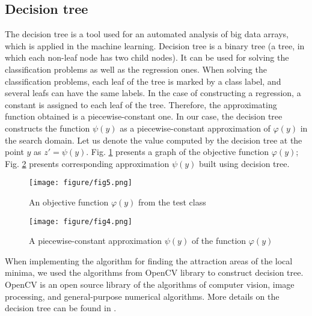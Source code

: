 \documentclass{cmi}
\begin{document}
\subsection{Decision tree}\label{SecDT}

The decision tree is a tool used for an automated analysis of big data arrays, which is applied in the  machine learning. Decision tree is a binary tree (a tree, in which each non-leaf node has two child nodes). It can be used for solving the classification problems as well as the regression ones. When solving  the classification problems, each leaf of the tree is marked by a class label, and several leafs can have  the same labels. In the case of constructing a regression, a constant is assigned to each leaf of the tree.   Therefore, the approximating function obtained is a piecewise-constant one. In our case, the decision tree constructs the function $\psi(y)$ as a piecewise-constant  approximation of $\varphi(y)$ in the search domain. Let us denote the value  computed by the  decision tree at the point $y$ as $z' = \psi(y)$.
Fig. \ref{fig:fig2} presents a graph of the objective function $\varphi(y)$; Fig. \ref{fig:fig2_2} presents corresponding approximation $\psi(y)$ built using decision tree. 


\begin{figure}
	\begin{center}
		\begin{minipage}[h]{0.7\linewidth}
			\texttt{[image: figure/fig5.png]}
			\caption{An objective function $\varphi(y)$ from the test class} %
			\label{fig:fig2}
		\end{minipage}
	\end{center}
\end{figure}	

\begin{figure}
	\begin{center}
		\begin{minipage}[h]{0.7\linewidth}
			\texttt{[image: figure/fig4.png]}
			\caption{A piecewise-constant  approximation $\psi(y)$ of the function $\varphi(y)$} %
			\label{fig:fig2_2}
		\end{minipage}
	\end{center}
\end{figure}	


When implementing the algorithm for finding the attraction areas of the local  minima, we used the algorithms from OpenCV library to construct decision tree. OpenCV is an open source library of the algorithms of computer vision, image processing, and  general-purpose numerical algorithms. More details on the decision tree can be found  in .
\end{document}
